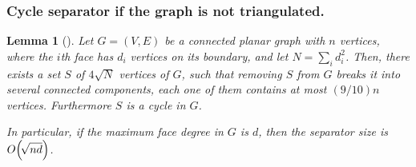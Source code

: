 \documentclass[12pt]{article}
\newtheorem{lemma}[theorem]{Lemma}
\theoremstyle{remark}\theoremheaderfont{\sf}\theorembodyfont{\upshape}\newtheorem{defn}[theorem]{Definition}
\newcommand{\lemlab}[1]{\label{lemma:#1}}
\newcommand{\SepSet}{S}
\renewcommand{\th}{th\xspace}
\newcommand{\Graph}{{G}}
\newcommand{\Vertices}{{V}}\newcommand{\Edges}{{E}}
\newcommand{\pth}[1]{\mleft({#1}\mright)}
\begin{document}
\subsubsection{Cycle separator if the graph is not triangulated.}


\begin{lemma}[\cite{m-fsscs-86}]
    \lemlab{separator:2:x}Let $\Graph = (\Vertices,\Edges)$ be a connected planar graph with
    $n$ vertices, where the $i$\th face has $d_i$ vertices on its
    boundary, and let $N = \sum_{i} d_i^2$.  Then, there exists a set
    $\SepSet$ of $4 \sqrt{N}$ vertices of $\Graph$, such that removing
    $S$ from $\Graph$ breaks it into several connected components,
    each one of them contains at most $(9/10)n$ vertices. Furthermore
    $\SepSet$ is a cycle in $\Graph$.

    In particular, if the maximum face degree in $\Graph$ is $d$, then
    the separator size is $O\pth{\!\sqrt{nd}}$.
\end{lemma}
\end{document}
